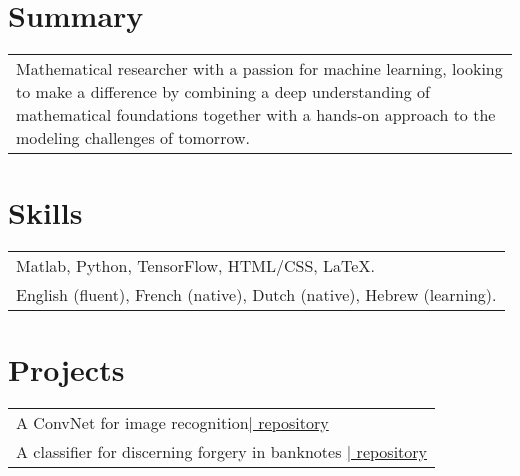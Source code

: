 \documentclass[margin,line,pifont,palatino,courierm]{res}
\begin{document}
\begin{resume}


\section{\sc Summary}

\begin{tabular}{| p{5in}}
Mathematical researcher with a passion for machine learning, looking to make a difference by combining a deep understanding of mathematical foundations together with a hands-on approach to the modeling challenges of tomorrow.\\	
\end{tabular}

\vspace{0.1in}
\section{\sc Skills}

\begin{tabular}{|  p{6in}}
Matlab, Python, TensorFlow, HTML/CSS, LaTeX.\\
English (fluent), French (native), Dutch (native), Hebrew (learning).\\

\end{tabular}
\vspace{0.1in}
\section{\sc Projects}
\begin{tabular}{|  p{5.1in}}
A ConvNet for image recognition\hfill  \hyperlink{}\href{https://github.com/ldethanhoffer/image_classification}{\hfill | \footnotesize \color{link} repository}\\
A classifier for discerning forgery in banknotes \hfill  \hyperlink{}\href{https://github.com/ldethanhoffer/banknote_forgery}{\hfill | \footnotesize \color{link} repository}\\\end{tabular}


\end{resume}
\end{document}
